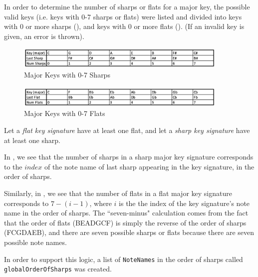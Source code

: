 \documentclass{report}
\begin{document}
In order to determine the number of sharps or flats for a major key, the possible valid keys (i.e. keys with 0-7 sharps or flats) were listed and divided into keys with 0 or more sharps (), and keys with 0 or more flats (). (If an invalid key is given, an error is thrown).

\begin{figure}[h!]
\centering
\includegraphics[width=0.9\textwidth]{images/major_sharp}
\caption{Major Keys with 0-7 Sharps}
\label{major_sharp}
\end{figure}

\begin{figure}[h!]
\centering
\includegraphics[width=0.9\textwidth]{images/major_flat}
\caption{Major Keys with 0-7 Flats}
\label{major_flat}
\end{figure}

\newpage

Let a \textit{flat key signature} have at least one flat, and let a \textit{sharp key signature} have at least one sharp.

In , we see that the number of sharps in a sharp major key signature corresponds to the $index$ of the note name of last sharp appearing in the key signature, in the order of sharps. 

Similarly, in , we see that the number of flats in a flat major key signature corresponds to $7-(i-1)$, where $i$ is the the index of the key signature's note name in the order of sharps. The ``seven-minus" calculation comes from the fact that the order of flats (BEADGCF) is simply the reverse of the order of sharps (FCGDAEB), and there are seven possible sharps or flats because there are seven possible note names. 

In order to support this logic, a list of \verb.NoteNames. in the order of sharps called \verb.globalOrderOfSharps. was created.
\end{document}
